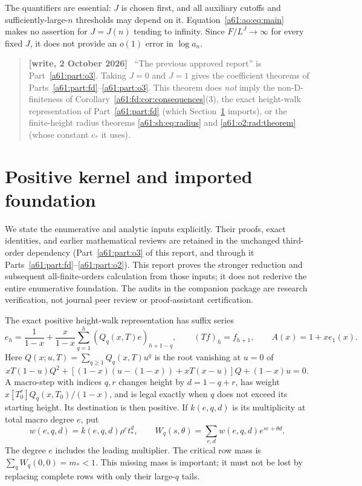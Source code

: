 \documentclass[11pt,letterpaper]{article}
\numberwithin{equation}{section}
\theoremstyle{remark}\newtheorem{remark}[theorem]{Remark}
\newenvironment{writenote}{\par\smallskip\begin{quote}\small\textbf{[write, 2 October 2026]}\ }{\end{quote}\smallskip}
\begin{document}
The quantifiers are essential: $J$ is chosen first, and all auxiliary
cutoffs and sufficiently-large-$n$ thresholds may depend on it.
Equation~\eqref{a61:ao:eq:main} makes no assertion for $J=J(n)$ tending to
infinity. Since $F/L^J\to\infty$ for every fixed $J$, it does not
provide an $o(1)$ error in $\log a_n$.
\begin{writenote}
``The previous approved report'' is Part~\ref{a61:part:o3}. Taking $J=0$ and $J=1$ gives the coefficient theorems of Parts~\ref{a61:part:fd}--\ref{a61:part:o3}. This theorem does \emph{not} imply the non-D-finiteness of Corollary~\ref{a61:fd:cor:consequences}(3), the exact height-walk representation of Part~\ref{a61:part:fd} (which Section~\ref{a61:ao:sec:kernel} imports), or the finite-height radius theorems \eqref{a61:sh:eq:radius} and \eqref{a61:o2:rad:theorem} (whose constant $c_*$ it uses).
\end{writenote}


\section{Positive kernel and imported foundation}\label{a61:ao:sec:kernel}
We state the enumerative and analytic inputs explicitly. Their proofs,
exact identities, and earlier mathematical reviews are retained in the
unchanged third-order dependency (Part~\ref{a61:part:o3} of this report, and through it Parts~\ref{a61:part:fd}--\ref{a61:part:o2}). This report proves the
stronger reduction and subsequent all-finite-orders calculation from
those inputs; it does not rederive the entire enumerative foundation.
The audits in the companion package are research verification, not
journal peer review or proof-assistant certification.

The exact positive height-walk representation has suffix series
\[
 e_h=\frac1{1-x}+\frac{x}{1-x}\sum_{q=1}^h(Q_q(x,T)e)_{h+1-q},
 \qquad (Tf)_h=f_{h+1},\qquad A(x)=1+xe_1(x).
\]
Here $Q(x;u,T)=\sum_{q\ge1}Q_q(x,T)u^q$ is the root vanishing at
$u=0$ of
\[
 xT(1-u)Q^2+[(1-x)(u-(1-x))+xT(x-u)]Q+(1-x)u=0.
\]
A macro-step with indices $q,r$ changes height by $d=1-q+r$, has
weight $x[T_0^r]Q_q(x,T_0)/(1-x)$, and is legal exactly when $q$ does
not exceed its starting height. Its destination is then positive.
If $k(e,q,d)$ is its multiplicity at total macro degree $e$, put
\[
 w(e,q,d)=k(e,q,d)\rho^e t_*^d,\qquad
 W_q(s,\theta)=\sum_{e,d}w(e,q,d)e^{se+\theta d}.
\]
The degree $e$ includes the leading multiplier. The critical row mass
is $\sum_qW_q(0,0)=m_*<1$. This missing mass is important; it must not
be lost by replacing complete rows with only their large-$q$ tails.
\end{document}

